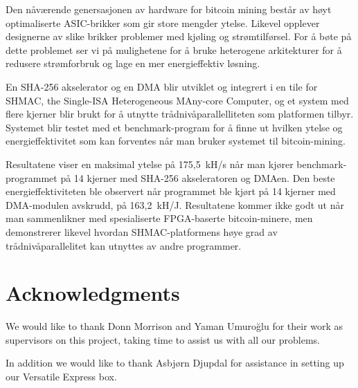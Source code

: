 Den nåværende genersasjonen av hardware for bitcoin mining består av høyt optimaliserte
ASIC-brikker som gir store mengder ytelse. Likevel opplever designerne av slike brikker
problemer med kjøling og strømtilførsel. For å bøte på dette problemet ser vi på mulighetene
for å bruke heterogene arkitekturer for å redusere strømforbruk og lage en mer energieffektiv
løsning.

En SHA-256 akselerator og en DMA blir utviklet og integrert i en tile for SHMAC,
the Single-ISA Heterogeneous MAny-core Computer, og et system med flere kjerner
blir brukt for å utnytte trådnivåparallelliteten som platformen tilbyr. Systemet
blir testet med et benchmark-program for å finne ut hvilken ytelse og energieffektivitet
som kan forventes når man bruker systemet til bitcoin-mining.

Resultatene viser en maksimal ytelse på 175,5~kH/s når man kjører benchmark-programmet
på 14 kjerner med SHA-256 akseleratoren og DMAen. Den beste energieffektiviteten
ble observert når programmet ble kjørt på 14 kjerner med DMA-modulen avskrudd,
på 163,2~kH/J. Resultatene kommer ikke godt ut når man sammenlikner med spesialiserte
FPGA-baserte bitcoin-minere, men demonstrerer likevel hvordan SHMAC-platformens høye
grad av trådnivåparallelitet kan utnyttes av andre programmer.

\chapter*{Acknowledgments}


We would like to thank Donn Morrison and Yaman Umuroğlu for their work as
supervisors on this project, taking time to assist us with all our problems.

In addition we would like to thank Asbjørn Djupdal for assistance in setting
up our Versatile Express box.

